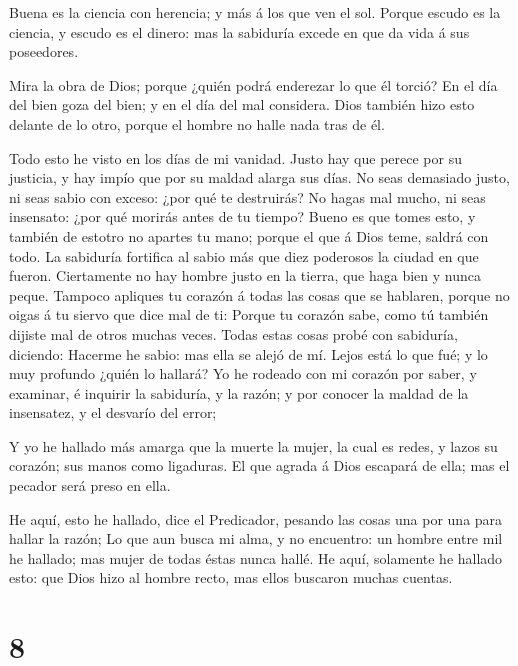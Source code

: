  Buena es la ciencia con herencia; y más á los que ven el
sol.  Porque escudo es la ciencia, y escudo es el dinero:
mas la sabiduría excede en que da vida á sus poseedores.

 Mira la obra de Dios; porque ¿quién podrá enderezar lo que
él torció?  En el día del bien goza del bien; y en el día
del mal considera. Dios también hizo esto delante de lo otro, porque el
hombre no halle nada tras de él.

 Todo esto he visto en los días de mi vanidad. Justo hay
que perece por su justicia, y hay impío que por su maldad alarga sus
días.  No seas demasiado justo, ni seas sabio con exceso:
¿por qué te destruirás?  No hagas mal mucho, ni seas
insensato: ¿por qué morirás antes de tu tiempo?  Bueno es
que tomes esto, y también de estotro no apartes tu mano; porque el que á
Dios teme, saldrá con todo.  La sabiduría fortifica al
sabio más que diez poderosos la ciudad en que fueron. 
Ciertamente no hay hombre justo en la tierra, que haga bien y nunca
peque.  Tampoco apliques tu corazón á todas las cosas que
se hablaren, porque no oigas á tu siervo que dice mal de ti:
 Porque tu corazón sabe, como tú también dijiste mal de
otros muchas veces.  Todas estas cosas probé con sabiduría,
diciendo: Hacerme he sabio: mas ella se alejó de mí.  Lejos
está lo que fué; y lo muy profundo ¿quién lo hallará?  Yo
he rodeado con mi corazón por saber, y examinar, é inquirir la
sabiduría, y la razón; y por conocer la maldad de la insensatez, y el
desvarío del error;

 Y yo he hallado más amarga que la muerte la mujer, la cual
es redes, y lazos su corazón; sus manos como ligaduras. El que agrada á
Dios escapará de ella; mas el pecador será preso en ella.

 He aquí, esto he hallado, dice el Predicador, pesando las
cosas una por una para hallar la razón;  Lo que aun busca
mi alma, y no encuentro: un hombre entre mil he hallado; mas mujer de
todas éstas nunca hallé.  He aquí, solamente he hallado
esto: que Dios hizo al hombre recto, mas ellos buscaron muchas cuentas.

\hypertarget{section-7}{%
\section{8}\label{section-7}}

